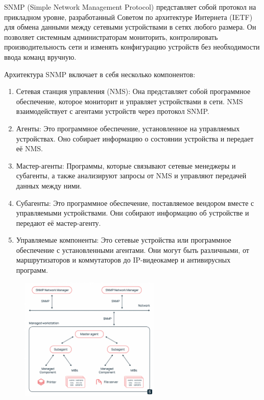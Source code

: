 SNMP (Simple Network Management Protocol) \cite{Mauro2005} представляет собой протокол на прикладном уровне, разработанный Советом по архитектуре Интернета (IETF) для обмена данными между сетевыми устройствами в сетях любого размера. Он позволяет системным администраторам мониторить, контролировать производительность сети и изменять конфигурацию устройств без необходимости ввода команд вручную.

Архитектура SNMP включает в себя несколько компонентов:

\begin{enumerate}
    \item Сетевая станция управления (NMS): Она представляет собой программное обеспечение, которое мониторит и управляет устройствами в сети. NMS взаимодействует с агентами устройств через протокол SNMP.
    \item Агенты: Это программное обеспечение, установленное на управляемых устройствах. Оно собирает информацию о состоянии устройства и передает её NMS.
    \item Мастер-агенты: Программы, которые связывают сетевые менеджеры и субагенты, а также анализируют запросы от NMS и управляют передачей данных между ними.
    \item Субагенты: Это программное обеспечение, поставляемое вендором вместе с управляемыми устройствами. Они собирают информацию об устройстве и передают её мастер-агенту.
    \item Управляемые компоненты: Это сетевые устройства или программное обеспечение с установленными агентами. Они могут быть различными, от маршрутизаторов и коммутаторов до IP-видеокамер и антивирусных программ.
\end{enumerate}

\begin{figure}[H]
    \centering
    \includegraphics*[width=0.6\textwidth]{./img/snmp-system.png}
\end{figure}

